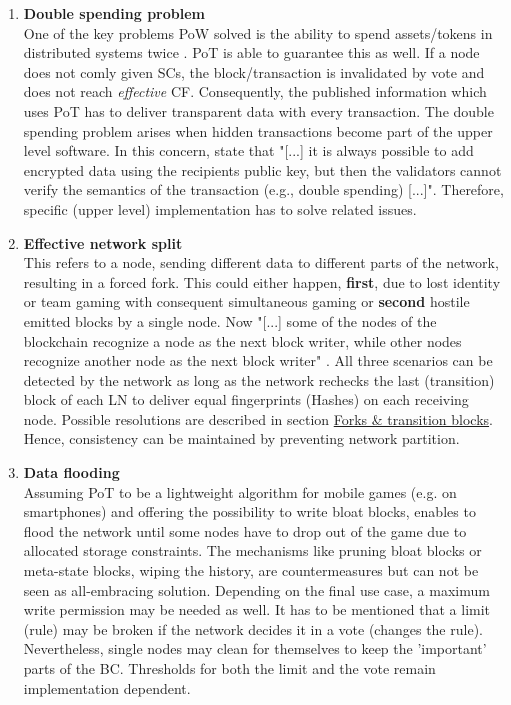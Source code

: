 \begin{enumerate}
	\item \textbf{Double spending problem} \\
	One of the key problems \gls{PoW} solved is the ability to spend assets/tokens in distributed systems twice \cite[1]{Nakamoto.2009}.
	\gls{PoT} is able to guarantee this as well.
	If a node does not comly given \gls{SC}s, the block/transaction is invalidated by vote and does not reach \textit{effective} \gls{CF}.
	Consequently, the published information which uses \gls{PoT} has to deliver transparent data with every transaction.
	The double spending problem arises when hidden transactions become part of the upper level software.
	In this concern, \citet[56]{Dib.2018} state that "[...] it is always possible to add encrypted data using the recipients public key,
	but then the validators cannot verify the semantics of the transaction (e.g., double spending) [...]".
	Therefore, specific (upper level) implementation has to solve related issues.
	
	\item \textbf{Effective network split} \\
	This refers to a node, sending different data to different parts of the network, resulting in a forced fork.
	This could either happen, \textbf{first}, due to lost identity or team gaming with consequent simultaneous gaming or \textbf{second} hostile emitted blocks by a single node.
	Now "[...] some of the nodes of the blockchain recognize a node as the next block writer,
	while other nodes recognize another node as	the next block writer" \cite[22-23]{Yuen.2019}.
	All three scenarios can be detected by the network as long as the network rechecks the last (transition) block of each \gls{LN} to deliver equal fingerprints (Hashes) on each receiving node.
	Possible resolutions are described in section \hyperref[sec:TransitionBlocks]{Forks \& transition blocks}.
	Hence, consistency can be maintained by preventing network partition.
	
	\item \textbf{Data flooding} \\
	Assuming \gls{PoT} to be a lightweight algorithm for mobile games (e.g. on smartphones) and offering the possibility to write bloat blocks,
	enables to flood the network until some nodes have to drop out of the game due to allocated storage constraints.
	The mechanisms like pruning bloat blocks or meta-state blocks, wiping the history, are countermeasures but can not be seen as all-embracing solution.
	Depending on the final use case, a maximum write permission may be needed as well.
	It has to be mentioned that a limit (rule) may be broken if the network decides it in a vote (changes the rule).
	Nevertheless, single nodes may clean for themselves to keep the 'important' parts of the \gls{BC}.
	Thresholds for both the limit and the vote remain implementation dependent.
			
\end{enumerate}

